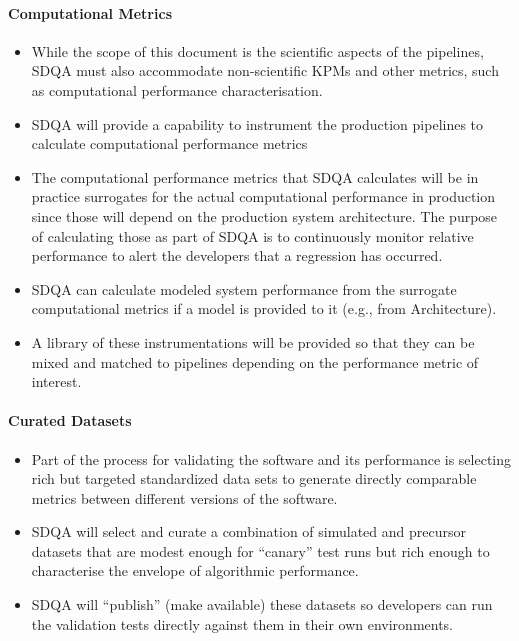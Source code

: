 \paragraph{Computational Metrics}
\label{sec:qaComputational}
\begin{itemize}

\item While the scope of this document is the scientific aspects of the pipelines, SDQA must also accommodate non-scientific KPMs and other metrics, such as computational performance characterisation.

\item SDQA will provide a capability to instrument the production pipelines to calculate computational performance metrics

\item The computational performance metrics that SDQA calculates will be in practice surrogates for the actual computational performance in production since those will depend on the production system architecture. The purpose of calculating those as part of SDQA is to continuously monitor relative performance to alert the developers that a regression has occurred.

\item SDQA can calculate modeled system performance from the surrogate computational metrics if a model is provided to it (e.g., from Architecture).

\item A library of these instrumentations will be provided so that they can be mixed and matched to pipelines depending on the performance metric of interest.

\end{itemize}


\paragraph{Curated Datasets}
\label{sec:qaCurateddata}
\begin{itemize}

\item Part of the process for validating the software and its performance is selecting rich but targeted standardized data sets to generate directly comparable metrics between different versions of the software.

\item SDQA will select and curate a combination of simulated and precursor datasets that are modest enough for ``canary'' test runs but rich enough to characterise the envelope of algorithmic performance.

\item SDQA will ``publish'' (make available) these datasets so developers can run the validation tests directly against them in their own environments.

\end{itemize}



